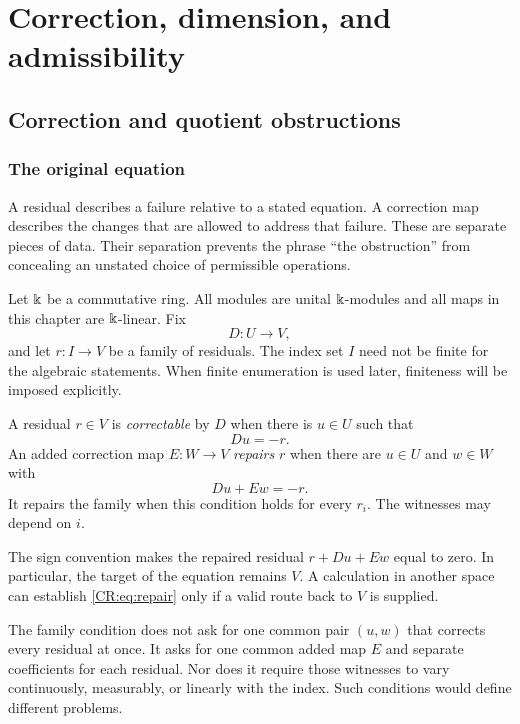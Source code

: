 
\chapter{Correction, dimension, and admissibility}\label{CR:book:chapter-55}
\section{Correction and quotient obstructions}\label{CR:cr-source-section-1}\label{CR:ch:basic}
\subsection{The original equation}
A residual describes a failure relative to a stated equation. A correction map describes the changes that are allowed to address that failure. These are separate pieces of data. Their separation prevents the phrase ``the obstruction'' from concealing an unstated choice of permissible operations.

Let $\Bbbk$ be a commutative ring. All modules are unital $\Bbbk$-modules and all maps in this chapter are $\Bbbk$-linear. Fix
\[
D:U\longrightarrow V,
\]
and let $r:I\to V$ be a family of residuals. The index set $I$ need not be finite for the algebraic statements. When finite enumeration is used later, finiteness will be imposed explicitly.

\begin{CRdefinition}\label{CR:def:repair}
A residual $r\in V$ is \emph{correctable} by $D$ when there is $u\in U$ such that
\begin{equation}\label{CR:eq:correct}
Du=-r.
\end{equation}
An added correction map $E:W\to V$ \emph{repairs} $r$ when there are $u\in U$ and $w\in W$ with
\begin{equation}\label{CR:eq:repair}
Du+Ew=-r.
\end{equation}
It repairs the family when this condition holds for every $r_i$. The witnesses may depend on $i$.
\end{CRdefinition}

The sign convention makes the repaired residual $r+Du+Ew$ equal to zero. In particular, the target of the equation remains $V$. A calculation in another space can establish \eqref{CR:eq:repair} only if a valid route back to $V$ is supplied.

The family condition does not ask for one common pair $(u,w)$ that corrects every residual at once. It asks for one common added map $E$ and separate coefficients for each residual. Nor does it require those witnesses to vary continuously, measurably, or linearly with the index. Such conditions would define different problems.

